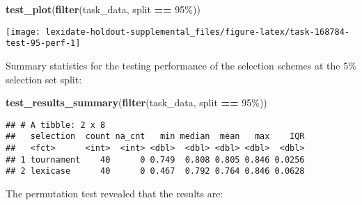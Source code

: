 \documentclass[
]{book}
\newenvironment{Shaded}{\begin{snugshade}}{\end{snugshade}}
\newcommand{\AttributeTok}[1]{\textcolor[rgb]{0.13,0.29,0.53}{#1}}
\newcommand{\DecValTok}[1]{\textcolor[rgb]{0.00,0.00,0.81}{#1}}
\newcommand{\FunctionTok}[1]{\textcolor[rgb]{0.13,0.29,0.53}{\textbf{#1}}}
\newcommand{\NormalTok}[1]{#1}
\newcommand{\OtherTok}[1]{\textcolor[rgb]{0.56,0.35,0.01}{#1}}
\newcommand{\SpecialCharTok}[1]{\textcolor[rgb]{0.81,0.36,0.00}{\textbf{#1}}}
\newcommand{\StringTok}[1]{\textcolor[rgb]{0.31,0.60,0.02}{#1}}
\begin{document}
\begin{Shaded}
\begin{Highlighting}[]
\FunctionTok{test\_plot}\NormalTok{(}\FunctionTok{filter}\NormalTok{(task\_data, split }\SpecialCharTok{==} \StringTok{\textquotesingle{}95\%\textquotesingle{}}\NormalTok{))}
\end{Highlighting}
\end{Shaded}

\texttt{[image: lexidate-holdout-supplemental\_files/figure-latex/task-168784-test-95-perf-1]}

Summary statistics for the testing performance of the selection schemes at the 5\% selection set split:

\begin{Shaded}
\begin{Highlighting}[]
\FunctionTok{test\_results\_summary}\NormalTok{(}\FunctionTok{filter}\NormalTok{(task\_data, split }\SpecialCharTok{==} \StringTok{\textquotesingle{}95\%\textquotesingle{}}\NormalTok{))}
\end{Highlighting}
\end{Shaded}

\begin{verbatim}
## # A tibble: 2 x 8
##   selection  count na_cnt   min median  mean   max    IQR
##   <fct>      <int>  <int> <dbl>  <dbl> <dbl> <dbl>  <dbl>
## 1 tournament    40      0 0.749  0.808 0.805 0.846 0.0256
## 2 lexicase      40      0 0.467  0.792 0.764 0.846 0.0628
\end{verbatim}

The permutation test revealed that the results are:

\begin{Shaded}
\end{Shaded}
\end{document}

